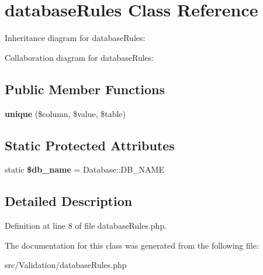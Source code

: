 \hypertarget{class_zest_1_1_validation_1_1database_rules}{}\section{database\+Rules Class Reference}
\label{class_zest_1_1_validation_1_1database_rules}


Inheritance diagram for database\+Rules\+:


Collaboration diagram for database\+Rules\+:
\subsection*{Public Member Functions}
\begin{DoxyCompactItemize}
\item 
\mbox{\label{class_zest_1_1_validation_1_1database_rules_af1ee82ec8960f8a8fd6d72a1f466adb2}} 
{\bfseries unique} (\$column, \$value, \$table)
\end{DoxyCompactItemize}
\subsection*{Static Protected Attributes}
\begin{DoxyCompactItemize}
\item 
\mbox{\label{class_zest_1_1_validation_1_1database_rules_a26dcb19f4431598ddd5f58147f131bee}} 
static {\bfseries \$db\+\_\+name} = Database\+::\+D\+B\+\_\+\+N\+A\+ME
\end{DoxyCompactItemize}


\subsection{Detailed Description}


Definition at line 8 of file database\+Rules.\+php.



The documentation for this class was generated from the following file\+:\begin{DoxyCompactItemize}
\item 
src/\+Validation/database\+Rules.\+php\end{DoxyCompactItemize}
